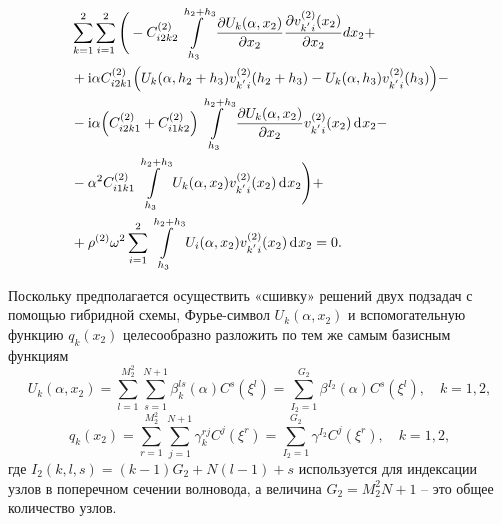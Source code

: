 \documentclass[press]{vestnik}
\begin{document}
\begin{equation} \label{weak_form_U_k}
	\begin{split}
		&\sum_{k=1}^{2} \sum_{i=1}^{2} 
		\Bigg(
		-C_{i2k2}^{(2)} \int\limits_{h_{3}}^{h_{2}+h_{3}} \frac{\partial U_{k}(\alpha,x_{2}) }{\partial x_{2} } \frac{\partial v_{k^{'}i}^{(2)}(x_{2}) }{\partial x_{2} } d x_{2} +
		\\
		&+{\rm{i}} \alpha C_{i2k1}^{(2)} 
		\Big(
		U_{k}(\alpha,h_{2}+h_{3})v_{k^{'}i}^{(2)}(h_{2}+h_{3}) - U_{k}(\alpha,h_{3}) v_{k^{'}i}^{(2)}(h_{3}) 
		\Big) -
		\\
		&- {\rm{i}} \alpha \Big( C_{i2k1}^{(2)} +C_{i1k2}^{(2)} \Big) \int\limits_{h_{3}}^{h_{2}+h_{3}} \frac{\partial U_{k}(\alpha,x_{2}) }{\partial x_{2} } v_{k^{'}i}^{(2)}(x_{2}) \d x_{2} -
		\\
		&- \alpha^{2} C_{i1k1}^{(2)} \int\limits_{h_{3}}^{h_{2}+h_{3}} U_{k}(\alpha,x_{2}) v_{k^{'}i}^{(2)}(x_{2}) \d x_{2}
		\Bigg) +
		\\
		&+\rho^{(2)} \omega^{2} \sum_{i=1}^{2} \int\limits_{h_{3}}^{h_{2}+h_{3}} U_{i}(\alpha,x_{2}) v_{k^{'}i}^{(2)}(x_{2}) \d x_{2} = 0.
	\end{split}
\end{equation}

Поскольку предполагается осуществить «сшивку» решений двух подзадач с помощью гибридной схемы, Фурье-символ $U_{k}(\alpha,x_{2})$ и вспомогательную функцию $q_{k}(x_{2})$ целесообразно разложить по тем же самым базисным функциям
\begin{equation} \label{U_k}
	U_{k}(\alpha,x_2)  =  \sum_{l=1}^{M_{2}^{2}} \sum_{s=1}^{N+1} \beta_{k}^{ls}(\alpha) C^{s}(\xi^l)
	= \sum_{I_2=1}^{G_{2}} \beta^{I_2}(\alpha) C^{s}(\xi^l), \quad k=1,2,
\end{equation}
\begin{equation} \label{q_k}
	  q_{k}(x_2) = \sum_{r=1}^{M_{2}^{2}} \sum_{j=1}^{N+1} \gamma_{k}^{rj} C^{j}(\xi^r) = \sum_{I_2=1}^{G_{2}} \gamma^{I_2} C^{j}(\xi^r), \quad k=1,2,
\end{equation}
где $I_2(k,l,s) = (k-1)G_{2}+N(l-1)+s$ используется для индексации узлов в поперечном сечении волновода, а величина $G_{2}=M_{2}^{2}N+1$ -- это общее количество узлов.
\end{document}
